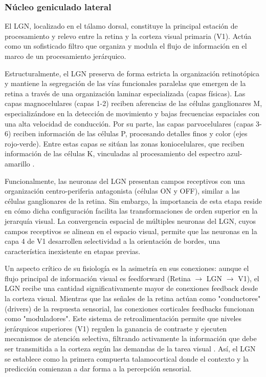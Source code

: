 \subsubsection{Núcleo geniculado lateral}

El \acrfull{LGN}, localizado en el tálamo dorsal, constituye la principal estación de procesamiento y relevo entre la retina y la corteza visual primaria (V1). Actúa como un sofisticado filtro que organiza y modula el flujo de información en el marco de un procesamiento jerárquico.

Estructuralmente, el \acrshort{LGN} preserva de forma estricta la organización retinotópica y mantiene la segregación de las vías funcionales paralelas que emergen de la retina a través de una organización laminar especializada (capas físicas). Las capas magnocelulares (capas 1-2) reciben aferencias de las células ganglionares M, especializándose en la detección de movimiento y bajas frecuencias espaciales con una alta velocidad de conducción. Por su parte, las capas parvocelulares (capas 3-6) reciben información de las células P, procesando detalles finos y color (ejes rojo-verde). Entre estas capas se sitúan las zonas koniocelulares, que reciben información de las células K, vinculadas al procesamiento del espectro azul-amarillo \citep{dayan2005theoretical}.

Funcionalmente, las neuronas del \acrshort{LGN} presentan campos receptivos con una organización centro-periferia antagonista (células ON y OFF), similar a las células ganglionares de la retina. Sin embargo, la importancia de esta etapa reside en cómo dicha configuración facilita las transformaciones de orden superior en la jerarquía visual. La convergencia espacial de múltiples neuronas del \acrshort{LGN}, cuyos campos receptivos se alinean en el espacio visual, permite que las neuronas en la capa 4 de V1 desarrollen selectividad a la orientación de bordes, una característica inexistente en etapas previas.

Un aspecto crítico de su fisiología es la asimetría en sus conexiones: aunque el flujo principal de información visual es feedforward (Retina $\rightarrow$ LGN $\rightarrow$ V1), el \acrshort{LGN} recibe una cantidad significativamente mayor de conexiones feedback desde la corteza visual. Mientras que las señales de la retina actúan como "conductores" (drivers) de la respuesta sensorial, las conexiones corticales feedbacks funcionan como "moduladores". Este sistema de retroalimentación permite que niveles jerárquicos superiores (V1) regulen la ganancia de contraste y ejecuten mecanismos de atención selectiva, filtrando activamente la información que debe ser transmitida a la corteza según las demandas de la tarea visual \citep{dayan2005theoretical}. Así, el \acrshort{LGN} se establece como la primera compuerta talamocortical donde el contexto y la predicción comienzan a dar forma a la percepción sensorial.


